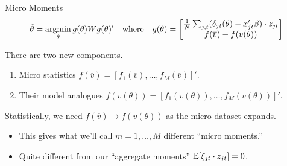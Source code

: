 \documentclass[aspectratio=169,t,11pt,table]{beamer}
\begin{document}
\begin{frame}{Micro Moments}
    \begin{equation*}
        \hat{\theta} = \operatorname*{argmin}_\theta g(\theta) W g(\theta)' \quad\text{where}\quad g(\theta) =
        \begin{bmatrix}
            \frac{1}{N} \sum_{j,t} (\delta_{jt}(\theta) - x_{jt}'\beta) \cdot z_{jt} \\
            f(\overline{v}) - f(v(\theta))
        \end{bmatrix}
    \end{equation*}
    \begin{wideitemize}
        \item There are two new components.
        \begin{enumerate}
            \item Micro statistics $f(\overline{v}) = [f_1(\overline{v}), \dots, f_M(\overline{v})]'$.
            \item Their model analogues $f(v(\theta)) = [f_1(v(\theta)), \dots, f_M(v(\theta))]'$.
        \end{enumerate}
        \pause
        \item Statistically, we need $f(\overline{v}) \to f(v(\theta))$ as the micro dataset expands.
        \begin{itemize}
            \item This gives what we'll call $m = 1, \dots, M$ different ``\alert{micro moments}.''
            \item Quite different from our ``aggregate moments'' $\mathbb{E}[\xi_{jt} \cdot z_{jt}] = 0$.
        \end{itemize}
    \end{wideitemize}
\end{frame}
\end{document}
